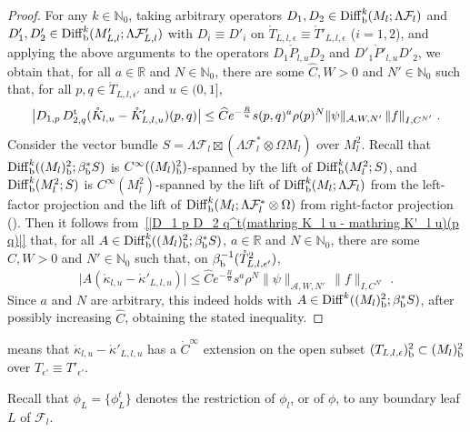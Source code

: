 \documentclass{memo-l}
\theoremstyle{plain}
\theoremstyle{definition}
\theoremstyle{remark}
\newcommand{\N}{\mathbb{N}}
\newcommand{\R}{\mathbb{R}}
\renewcommand{\AA}{\mathcal{A}}
\newcommand{\FF}{\mathcal{F}}
\newcommand{\Diff}{\operatorname{Diff}}
\newcommand{\trans}{{\text{\rm t}}}
\newcommand{\Diffb}{\Diff_{\text{\rm b}}}
\numberwithin{section}{chapter}
\numberwithin{equation}{section}%
\begin{document}
\begin{proof}
For any $k\in\N_0$, taking arbitrary operators $D_1, D_2\in \Diffb^k(M_l;\Lambda\FF_l)$ and $D'_1, D'_2\in \Diffb^k(M'_{L,l};\Lambda\FF'_{L,l})$ with $D_i\equiv D'_i$ on $\mathring T_{L,l,\epsilon}\equiv\mathring T'_{L,l,\epsilon}$ ($i=1,2$), and applying the above arguments to the operators $D_1\mathring P_{l,u}D_2$ and $D'_1\mathring P'_{l,u}D'_2$, we obtain that, for all $a\in\R$ and $N\in\N_0$, there are some $\widehat C,W>0$ and $N'\in\N_0$ such that, for all $p,q\in\mathring T_{L,l,\epsilon'}$ and $u\in(0,1]$,
\begin{equation}\label{|D_1 p D_2 q^t(mathring K_l u - mathring K'_l u)(p q)|}
\big|D_{1,p}\,D_{2,q}^\trans(\mathring K_{l,u}-\mathring K'_{L,l,u})(p,q)\big|
\le\widehat Ce^{-\frac{R}{u}}s(p,q)^a\rho(p)^N\|\psi\|_{\AA,W,N'}\,\|f\|_{I,C^{N'}}\;.
\end{equation}
Consider the vector bundle $S=\Lambda\FF_l\boxtimes(\Lambda\FF_l^*\otimes\Omega M_l)$ over $M_l^2$. Recall that $\Diffb^k((M_l)^2_{\text{\rm b}};\beta_{\text{\rm b}}^*S)$ is $C^\infty((M_l)^2_{\text{\rm b}})$-spanned by the lift of $\Diffb^k(M_l^2;S)$, and $\Diffb^k(M_l^2;S)$ is $C^\infty(M_l^2)$-spanned by the lift of $\Diffb^k(M_l;\Lambda\FF_l)$ from the left-factor projection and the lift of $\Diffb^k(M_l;\Lambda\FF_l^*\otimes\Omega)$ from right-factor projection (). Then it follows from~\eqref{|D_1 p D_2 q^t(mathring K_l u - mathring K'_l u)(p q)|} that, for all $A\in\Diffb^k((M_l)^2_{\text{\rm b}};\beta_{\text{\rm b}}^*S)$, $a\in\R$ and $N\in\N_0$, there are some $\widehat C,W>0$ and $N'\in\N_0$ such that, on $\beta_{\text{\rm b}}^{-1}(\mathring T_{L,l,\epsilon'}^2)$,
\[
\big|A(\mathring\kappa_{l,u}-\mathring\kappa'_{L,l,u})\big|
\le\widehat Ce^{-\frac{R}{u}}s^a\rho^N\|\psi\|_{\AA,W,N'}\,\|f\|_{I,C^{N'}}\;.
\]
Since $a$ and $N$ are arbitrary, this indeed holds with $A\in\Diff^k((M_l)^2_{\text{\rm b}};\beta_{\text{\rm b}}^*S)$, after possibly increasing $\widehat C$, obtaining the stated inequality.
\end{proof}

 means that $\mathring\kappa_{l,u}-\mathring\kappa'_{L,l,u}$ has a $\dot C^\infty$ extension on the open subset $(T_{L,l,\epsilon})^2_{\text{\rm b}}\subset(M_l)^2_{\text{\rm b}}$ over $T_{\epsilon'}\equiv T'_{\epsilon'}$.

Recall that $\phi_L=\{\phi_L^t\}$ denotes the restriction of $\phi_l$, or of $\phi$, to any boundary leaf $L$ of $\FF_l$.
\end{document}

